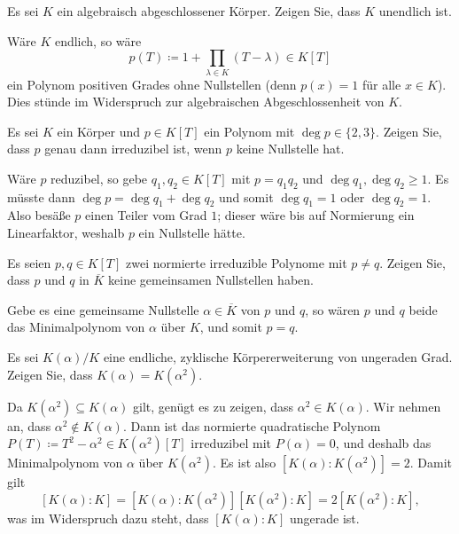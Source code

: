 \begin{question}
  Es sei $K$ ein algebraisch abgeschlossener Körper.
  Zeigen Sie, dass $K$ unendlich ist.
\end{question}


\begin{solution}
  Wäre $K$ endlich, so wäre
  \[
              p(T)
    \coloneqq 1 + \prod_{\lambda \in K} (T - \lambda)
    \in       K[T]
  \]
  ein Polynom positiven Grades ohne Nullstellen (denn $p(x) = 1$ für alle $x \in K$).
  Dies stünde im Widerspruch zur algebraischen Abgeschlossenheit von $K$.
\end{solution}


\begin{question}
  Es sei $K$ ein Körper und $p \in K[T]$ ein Polynom mit $\deg p \in \{2, 3\}$.
  Zeigen Sie, dass $p$ genau dann irreduzibel ist, wenn $p$ keine Nullstelle hat.
\end{question}


\begin{solution}
  Wäre $p$ reduzibel, so gebe $q_1, q_2 \in K[T]$ mit $p = q_1 q_2$ und $\deg q_1, \deg q_2 \geq 1$.
  Es müsste dann $\deg p = \deg q_1 + \deg q_2$ und somit $\deg q_1 = 1$ oder $\deg q_2 = 1$.
  Also besäße $p$ einen Teiler vom Grad $1$;
  dieser wäre bis auf Normierung ein Linearfaktor, weshalb $p$ ein Nullstelle hätte.
\end{solution}


\begin{question}
  Es seien $p, q \in K[T]$ zwei normierte irreduzible Polynome mit $p \neq q$.
  Zeigen Sie, dass $p$ und $q$ in $\overline{K}$ keine gemeinsamen Nullstellen haben.
\end{question}


\begin{solution}
  Gebe es eine gemeinsame Nullstelle $\alpha \in \overline{K}$ von $p$ und $q$, so wären $p$ und $q$ beide das Minimalpolynom von $\alpha$ über $K$, und somit $p = q$.
\end{solution}


\begin{question}
  Es sei $K(\alpha)/K$ eine endliche, zyklische Körpererweiterung von ungeraden Grad.
  Zeigen Sie, dass $K(\alpha) = K(\alpha^2)$.
\end{question}


\begin{solution}
  Da $K(\alpha^2) \subseteq K(\alpha)$ gilt, genügt es zu zeigen, dass $\alpha^2 \in K(\alpha)$.
  Wir nehmen an, dass $\alpha^2 \notin K(\alpha)$.
  Dann ist das normierte quadratische Polynom $P(T) \coloneqq T^2 - \alpha^2 \in K(\alpha^2)[T]$ irreduzibel mit $P(\alpha) = 0$, und deshalb das Minimalpolynom von $\alpha$ über $K(\alpha^2)$.
  Es ist also $[K(\alpha) : K(\alpha^2)] = 2$.
  Damit gilt
  \[
      [K(\alpha) : K]
    = [K(\alpha) : K(\alpha^2)] [K(\alpha^2) : K]
    = 2 [K(\alpha^2) : K],
  \]
  was im Widerspruch dazu steht, dass $[K(\alpha) : K]$ ungerade ist.
\end{solution}


